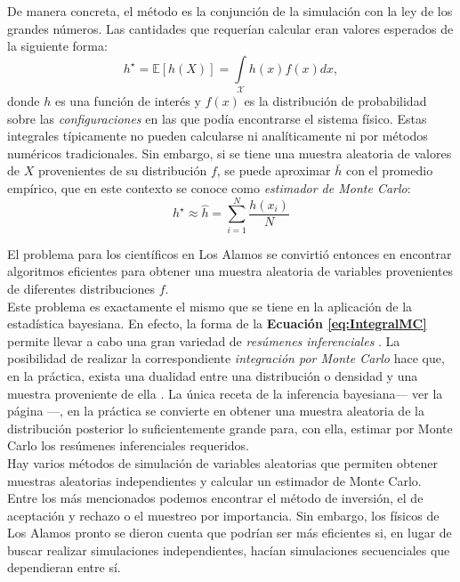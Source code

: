 De manera concreta, el método es la conjunción de la simulación con la ley de los grandes números. Las cantidades que requerían calcular eran valores esperados de la siguiente forma: 
\begin{equation}
\label{eq:IntegralMC}
h^\star = \mathbb{E}[h(X)]=\int\limits_\mathcal{X} h(x)f(x)dx ,
\end{equation} 
donde $h$ es una función de interés y $f(x)$ es la distribución de probabilidad sobre las \textit{configuraciones} en las que podía encontrarse el sistema físico. Estas integrales típicamente no pueden calcularse ni analíticamente ni por métodos numéricos tradicionales. Sin embargo, si se tiene una muestra aleatoria de valores de $X$ provenientes de su distribución $f$, se puede aproximar $\bar{h}$ con el promedio empírico, que en este contexto se conoce como \textit{estimador de Monte Carlo}: 
\begin{equation*}
h^\star \approx \hat{h} = \sum\limits_{i=1}^N \dfrac{h(x_i)}{N}
\end{equation*}

El problema para los científicos en Los Alamos se convirtió entonces en encontrar algoritmos eficientes para obtener una muestra aleatoria de variables provenientes de diferentes distribuciones $f$.\\ 

Este problema es exactamente el mismo que se tiene en la aplicación de la estadística bayesiana. En efecto, la forma de la \textbf{Ecuación \ref{eq:IntegralMC}} permite llevar a cabo una gran variedad de \textit{resúmenes inferenciales} \parencite{GP97}. La posibilidad de realizar la correspondiente \textit{integración por Monte Carlo} hace que, en la práctica, exista una dualidad entre una distribución o densidad y una muestra proveniente de ella \parencite{SmithGelfand92}. La única receta de la inferencia bayesiana--- ver la página \pageref{receta_bayesiana}---, en la práctica se convierte en obtener una muestra aleatoria de la distribución posterior lo suficientemente grande para, con ella, estimar por Monte Carlo los resúmenes inferenciales requeridos.\\

Hay varios métodos de simulación de variables aleatorias que permiten obtener muestras aleatorias independientes y calcular un estimador de Monte Carlo. Entre los más mencionados podemos encontrar el método de inversión, el de aceptación y rechazo o el muestreo por importancia. Sin embargo, los físicos de Los Alamos pronto se dieron cuenta que podrían ser más eficientes si, en lugar de buscar realizar simulaciones independientes, hacían simulaciones secuenciales que dependieran entre sí. 

